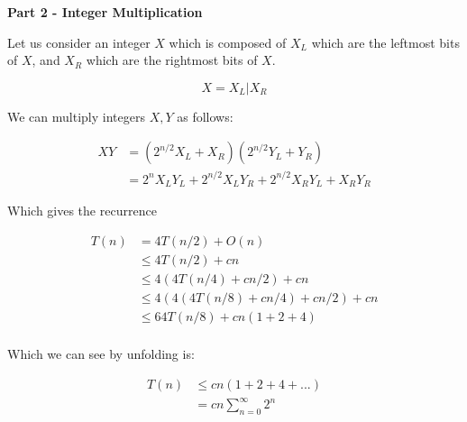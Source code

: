 {\bf Part 2 - Integer Multiplication}

Let us consider an integer $X$ which is composed of $X_L$ which are
the leftmost bits of $X$, and $X_R$ which are the rightmost bits of
$X$.

\begin{displaymath}
X = X_L | X_R
\end{displaymath}

We can multiply integers $X,Y$ as follows:

\begin{align*}
XY
&= (2^{n/2}X_L + X_R)(2^{n/2}Y_L + Y_R) \\
&= 2^n X_LY_L + 2^{n/2}X_LY_R + 2^{n/2}X_RY_L + X_RY_R
\end{align*}

Which gives the recurrence

\begin{align*}
T(n)
&= 4T(n/2) + O(n) \\
&\leq 4T(n/2) + cn \\
&\leq 4(4T(n/4) + cn/2) + cn \\
&\leq 4(4(4T(n/8) + cn/4) + cn/2) + cn \\
&\leq 64T(n/8) + cn(1 + 2 + 4) \\
\end{align*}

Which we can see by unfolding is:

\begin{align*}
T(n)
&\leq cn(1 + 2 + 4 + ...) \\
&= cn \sum\limits_{n=0}^{\infty} 2^n
\end{align*}
